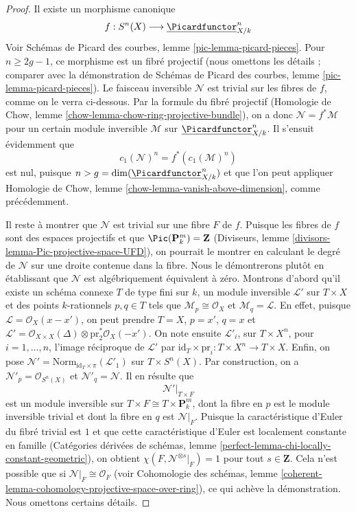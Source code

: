 \begin{proof}
\medskip\noindent
Il existe un morphisme canonique
$$
f : S^n(X) \longrightarrow \underline{\Picardfunctor}^n_{X/k}
$$
Voir Schémas de Picard des courbes, lemme \ref{pic-lemma-picard-pieces}.
Pour $n \geq 2g - 1$, ce morphisme est un fibré projectif
(nous omettons les détails ; comparer avec la
démonstration de Schémas de Picard des courbes, lemme \ref{pic-lemma-picard-pieces}).
Le faisceau inversible $\mathcal{N}$ est trivial sur les
fibres de $f$, comme on le verra ci-dessous. Par la formule du fibré projectif
(Homologie de Chow, lemme \ref{chow-lemma-chow-ring-projective-bundle}),
on a donc $\mathcal{N} = f^*\mathcal{M}$ pour un certain module
inversible $\mathcal{M}$ sur $\underline{\Picardfunctor}^n_{X/k}$.
Il s'ensuit évidemment que
$$
c_1(\mathcal{N})^n = f^*(c_1(\mathcal{M})^n)
$$
est nul, puisque $n > g = \dim(\underline{\Picardfunctor}^n_{X/k})$
et que l'on peut appliquer Homologie de Chow, lemme \ref{chow-lemma-vanish-above-dimension},
comme précédemment.

\medskip\noindent
Il reste à montrer que $\mathcal{N}$ est trivial sur une fibre $F$
de $f$. Puisque les fibres de $f$ sont des espaces projectifs et que
$\Pic(\mathbf{P}^m_k) = \mathbf{Z}$
(Diviseurs, lemme \ref{divisors-lemma-Pic-projective-space-UFD}),
on pourrait le montrer en calculant le degré de $\mathcal{N}$
sur une droite contenue dans la fibre. Nous le démontrerons plutôt
en établissant que $\mathcal{N}$ est algébriquement
équivalent à zéro. Montrons d'abord qu'il existe un schéma connexe $T$ de type fini
sur $k$, un module inversible $\mathcal{L}'$ sur $T \times X$ et des points
$k$-rationnels $p, q \in T$ tels que
$\mathcal{M}_p \cong \mathcal{O}_X$ et $\mathcal{M}_q = \mathcal{L}$.
En effet, puisque $\mathcal{L} = \mathcal{O}_X(x - x')$, on peut prendre
$T = X$, $p = x'$, $q = x$ et
$\mathcal{L}' = \mathcal{O}_{X \times X}(\Delta)
\otimes \text{pr}_2^*\mathcal{O}_X(-x')$.
On note ensuite $\mathcal{L}'_i$, sur
$T \times X^n$, pour $i = 1, \ldots, n$,
l'image réciproque de $\mathcal{L}'$ par
$\text{id}_T \times \text{pr}_i : T \times X^n \to T \times X$.
Enfin, on pose
$\mathcal{N}' = \text{Norm}_{\text{id}_T \times \pi}(\mathcal{L}'_1)$
sur $T \times S^n(X)$.
Par construction, on a $\mathcal{N}'_p = \mathcal{O}_{S^n(X)}$
et $\mathcal{N}'_q = \mathcal{N}$.
Il en résulte que
$$
\mathcal{N}'|_{T \times F}
$$
est un module inversible sur $T \times F \cong T \times \mathbf{P}^m_k$,
dont la fibre en $p$ est le module inversible trivial et dont la fibre
en $q$ est $\mathcal{N}|_F$. Puisque la caractéristique d'Euler
du fibré trivial est $1$ et que cette caractéristique d'Euler
est localement constante en famille (Catégories dérivées de schémas,
lemme \ref{perfect-lemma-chi-locally-constant-geometric}),
on obtient $\chi(F, \mathcal{N}^{\otimes s}|_F) = 1$
pour tout $s \in \mathbf{Z}$. Cela n'est possible que si
$\mathcal{N}|_F \cong \mathcal{O}_F$ (voir
Cohomologie des schémas, lemme
\ref{coherent-lemma-cohomology-projective-space-over-ring}),
ce qui achève la démonstration. Nous omettons certains détails.
\end{proof}
